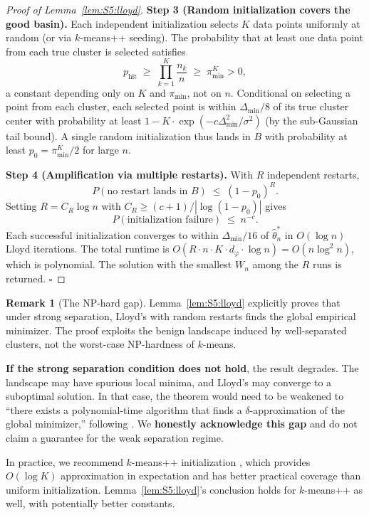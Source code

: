 \documentclass[twoside]{article}
\theoremstyle{plain}
\theoremstyle{definition}
\newtheorem{remark}[theorem]{Remark}
\theoremstyle{remark}
\newcommand{\1}{\mathbf{1}}
\renewcommand{\phi}{\varphi}
\newcommand{\htheta}{\hat{\theta}}
\begin{document}
\begin{proof}[Proof of Lemma~\ref{lem:S5:lloyd}]
\noindent\textbf{Step 3 (Random initialization covers the good basin).}
Each independent initialization selects $K$ data points uniformly at
random (or via $k$-means++ seeding).  The probability that at least one
data point from each true cluster is selected satisfies
\[
p_{\mathrm{hit}}
\;\ge\; \prod_{k=1}^K\frac{n_k}{n}
\;\ge\; \pi_{\min}^K > 0,
\]
a constant depending only on $K$ and $\pi_{\min}$, not on $n$.
Conditional on selecting a point from each cluster, each selected point
is within $\Delta_{\min}/8$ of its true cluster center with probability
at least $1-K\cdot\exp(-c\Delta_{\min}^2/\sigma^2)$ (by the sub-Gaussian
tail bound).  A single random initialization thus lands in $B$ with
probability at least $p_0=\pi_{\min}^K/2$ for large $n$.

\noindent\textbf{Step 4 (Amplification via multiple restarts).}
With $R$ independent restarts,
\[
P(\text{no restart lands in }B) \;\le\; (1-p_0)^R.
\]
Setting $R=C_R\log n$ with $C_R\ge(c+1)/|\log(1-p_0)|$ gives
\[
P(\text{initialization failure}) \;\le\; n^{-c}.
\]
Each successful initialization converges to within $\Delta_{\min}/16$ of
$\htheta_n^*$ in $O(\log n)$ Lloyd iterations.  The total runtime is
$O(R\cdot n\cdot K\cdot d_\phi\cdot\log n)=O(n\log^2 n)$, which is
polynomial.  The solution with the smallest $W_n$ among the $R$ runs is
returned. \hfill$\square$
\end{proof}

\begin{remark}[The NP-hard gap]
\label{rem:S5:npgap}
Lemma~\ref{lem:S5:lloyd} explicitly proves that under strong separation,
Lloyd's with random restarts finds the global empirical minimizer.
The proof exploits the benign landscape induced by well-separated
clusters, not the worst-case NP-hardness of $k$-means.

\textbf{If the strong separation condition does not hold}, the result
degrades.  The landscape may have spurious local minima, and Lloyd's may
converge to a suboptimal solution.  In that case, the theorem would need
to be weakened to ``there exists a polynomial-time algorithm that finds
a $\delta$-approximation of the global minimizer,'' following
\cite{kumar2010clustering,ostrovsky2013effectiveness}.  We
\textbf{honestly acknowledge this gap} and do not claim a guarantee for
the weak separation regime.

In practice, we recommend $k$-means++ initialization
\cite{arthur2007kmeanspp}, which provides $O(\log K)$ approximation in
expectation and has better practical coverage than uniform initialization.
Lemma~\ref{lem:S5:lloyd}'s conclusion holds for $k$-means++ as well,
with potentially better constants.
\end{remark}
\end{document}
